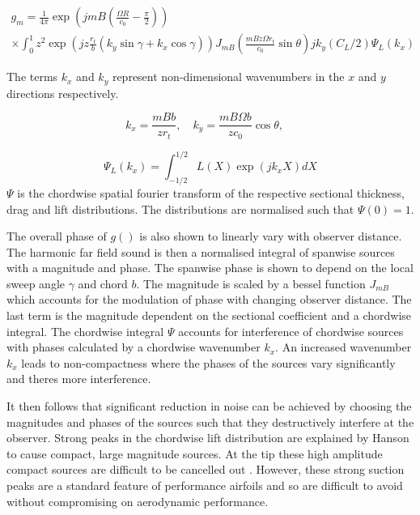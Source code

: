 \documentclass[12pt,a4paper]{article}
\begin{document}
\begin{equation}
    \begin{aligned}
        g_m = \frac{1}{4\pi} \exp\left(jmB \left( \frac{\Omega R}{c_0} - \frac{\pi}{2} \right)\right) \\
        \times \int_0^1 z^2 \exp \left(j z \frac{r_t}{b} \left(k_y \sin \gamma + k_x \cos \gamma\right) \right) J_{mB} \left( \frac{mB z \Omega r_t}{c_0} \sin \theta \right)
            jk_y (C_L / 2) \Psi_L(k_x)
    \end{aligned}
    \label{eq:hansons_result}
\end{equation}

The terms $k_x$ and $k_y$ represent non-dimensional wavenumbers in the $x$ and $y$ directions respectively.

\begin{equation}
    k_x = \frac{mB b}{z r_t}, \quad
    k_y = \frac{mB\Omega b}{z c_0} \cos \theta, \quad
\end{equation}

\begin{equation}
    \Psi_L(k_x) = \int_{-1/2}^{1/2} L(X) \exp(jk_x X) dX
\end{equation}
$\Psi$ is the chordwise spatial fourier transform of the respective sectional thickness, drag and lift distributions.
The distributions are normalised such that $\Psi(0) = 1$.

The overall phase of $g()$ is also shown to linearly vary with observer distance.
The harmonic far field sound is then a normalised integral of spanwise sources with a magnitude and phase.
The spanwise phase is shown to depend on the local sweep angle $\gamma$ and chord $b$.
The magnitude is scaled by a bessel function $J_{mB}$ which accounts for the modulation of phase with changing observer distance.
The last term is the magnitude dependent on the sectional coefficient and a chordwise integral.
The chordwise integral $\Psi$ accounts for interference of chordwise sources with phases calculated by a chordwise wavenumber $k_x$.
An increased wavenumber $k_x$ leads to non-compactness where the phases of the sources vary significantly and theres more interference.

It then follows that significant reduction in noise can be achieved by choosing the magnitudes and phases of the sources such that they destructively interfere at the observer.
Strong peaks in the chordwise lift distribution are explained by Hanson \cite{hanson_influence} to cause compact, large magnitude sources.
At the tip these high amplitude compact sources are difficult to be cancelled out \cite{hanson_influence}.
However, these strong suction peaks are a standard feature of performance airfoils 
and so are difficult to avoid without compromising on aerodynamic performance.
\end{document}
